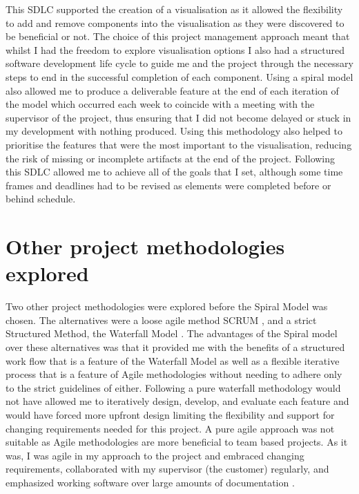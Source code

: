 This SDLC supported the creation of a visualisation as
it allowed the flexibility to add and remove components into the visualisation
as they were discovered to be beneficial or not. The choice of this project management approach
meant that whilst I had the freedom to explore visualisation options I also had
a structured software development life cycle to guide me and the project through
the necessary steps to end in the successful completion of each
component.
%
Using a spiral model also allowed me to produce a deliverable feature at the end
of each iteration of the model which occurred each week to coincide with a
meeting with the supervisor of the project, thus ensuring that I did not become delayed or stuck
in my development with nothing produced. Using this methodology also
helped to prioritise the features that were the most important to the
visualisation, reducing the risk of missing or incomplete
artifacts at the end of the project. 
Following this SDLC allowed me to achieve all of the goals
that I set, although some time frames and deadlines had to be revised as elements were completed before or behind schedule. 


\section{Other project methodologies explored}
Two other project methodologies were explored before the
Spiral Model was chosen. The alternatives were a loose agile method SCRUM \cite{schwaber2004agile}, and
a strict Structured Method, the Waterfall Model \cite{royce1970managing}. 
The advantages of the Spiral model over these alternatives was that it provided
me with the benefits of a structured work flow that is a feature of the
Waterfall Model as
well as a flexible iterative process that is a feature of Agile methodologies
without needing to adhere only to the strict guidelines of either. Following a
pure waterfall methodology would not have allowed me to iteratively
design, develop, and evaluate each feature and would have forced more upfront
design limiting the flexibility and support for changing requirements 
needed for this project. A pure agile approach was not suitable as Agile methodologies are more
beneficial to team based projects. As it was,
I was agile in my approach to the project and embraced changing requirements,
collaborated with my supervisor (the customer) regularly, and emphasized working
software over large amounts of documentation \cite{beck2001agile}. 

